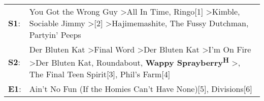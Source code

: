 \begin{supertabular}{p{0.03\textwidth}p{0.92\textwidth}}
 \textbf{S1}:  &                                                                        You Got the Wrong Guy\textsuperscript{} \textgreater \enspace All In Time\textsuperscript{}, \enspace Ringo[1]\textsuperscript{} \textgreater \enspace Kimble\textsuperscript{}, \enspace Sociable Jimmy\textsuperscript{} \textgreater {}[2]\textsuperscript{} \textgreater \enspace Hajimemashite\textsuperscript{}, \enspace The Fussy Dutchman\textsuperscript{}, \enspace Partyin' Peeps\textsuperscript{}  \enspace  \\
 \textbf{S2}:  &  Der Bluten Kat\textsuperscript{} \textgreater \enspace Final Word\textsuperscript{} \textgreater \enspace Der Bluten Kat\textsuperscript{} \textgreater \enspace I'm On Fire\textsuperscript{} \textgreater \enspace Der Bluten Kat\textsuperscript{}, \enspace Roundabout\textsuperscript{}, \enspace \textbf{Wappy Sprayberry\textsuperscript{H}} \textgreater {}\textsuperscript{}, \enspace The Final Teen Spirit[3]\textsuperscript{}, \enspace Phil's Farm[4]\textsuperscript{}  \enspace  \\
 \textbf{E1}:  &                                                                                                                                                                                                                                                                                                                                                                                        Ain't No Fun (If the Homies Can't Have None)[5]\textsuperscript{}, \enspace Divisions[6]\textsuperscript{}  \enspace  \\
\end{supertabular}
